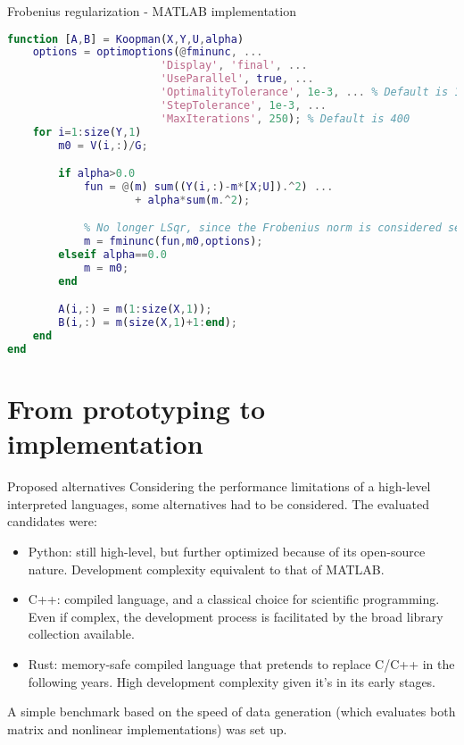 \documentclass{beamer}
\begin{document}
\begin{frame}[fragile]{Frobenius regularization - MATLAB implementation}
    \begin{lstlisting}[language=Matlab,basicstyle=\tiny]
function [A,B] = Koopman(X,Y,U,alpha)
    options = optimoptions(@fminunc, ...
                        'Display', 'final', ...
                        'UseParallel', true, ...
                        'OptimalityTolerance', 1e-3, ... % Default is 1e-6
                        'StepTolerance', 1e-3, ...
                        'MaxIterations', 250); % Default is 400
    for i=1:size(Y,1)
        m0 = V(i,:)/G;

        if alpha>0.0
            fun = @(m) sum((Y(i,:)-m*[X;U]).^2) ...
                    + alpha*sum(m.^2);

            % No longer LSqr, since the Frobenius norm is considered separately
            m = fminunc(fun,m0,options);
        elseif alpha==0.0
            m = m0;
        end

        A(i,:) = m(1:size(X,1));
        B(i,:) = m(size(X,1)+1:end);
    end
end
    \end{lstlisting}
\end{frame}


\section{From prototyping to implementation}

\begin{frame}{Proposed alternatives}
    Considering the performance limitations of a high-level interpreted languages, some alternatives had to be considered. The evaluated candidates were:

    \begin{itemize}
        \item Python: still high-level, but further optimized because of its open-source nature. Development complexity equivalent to that of MATLAB.
        \item C++: compiled language, and a classical choice for scientific programming. Even if complex, the development process is facilitated by the broad library collection available.
        \item Rust: memory-safe compiled language that pretends to replace C/C++ in the following years. High development complexity given it's in its early stages.
    \end{itemize}

    A simple benchmark based on the speed of data generation (which evaluates both matrix and nonlinear implementations) was set up.
\end{frame}
\end{document}

